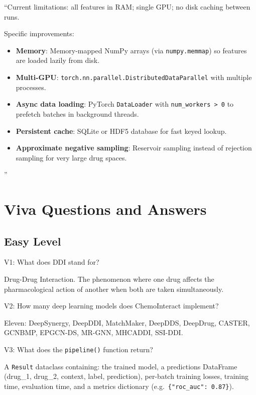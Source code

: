 \documentclass[12pt,a4paper,oneside]{book}
\begin{document}
\begin{tcolorbox}[questionbox,title={Q11: How would you scale ChemoInteract to 100 million drug pairs?}]
\end{tcolorbox}
\begin{tcolorbox}[answerbox]
``Current limitations: all features in RAM; single GPU; no disk caching between runs.

Specific improvements:
\begin{itemize}
  \item \textbf{Memory}: Memory-mapped NumPy arrays (via \texttt{numpy.memmap}) so features are loaded lazily from disk.
  \item \textbf{Multi-GPU}: \texttt{torch.nn.parallel.DistributedDataParallel} with multiple processes.
  \item \textbf{Async data loading}: PyTorch \texttt{DataLoader} with \texttt{num\_workers > 0} to prefetch batches in background threads.
  \item \textbf{Persistent cache}: SQLite or HDF5 database for fast keyed lookup.
  \item \textbf{Approximate negative sampling}: Reservoir sampling instead of rejection sampling for very large drug spaces.
\end{itemize}''
\end{tcolorbox}
\chapter{Viva Questions and Answers}\label{chap:viva}

\section{Easy Level}

\begin{tcolorbox}[vivabox]
V1: What does DDI stand for?
\end{tcolorbox}
Drug-Drug Interaction. The phenomenon where one drug affects the pharmacological action of another when both are taken simultaneously.

\begin{tcolorbox}[vivabox]
V2: How many deep learning models does ChemoInteract implement?
\end{tcolorbox}
Eleven: DeepSynergy, DeepDDI, MatchMaker, DeepDDS, DeepDrug, CASTER, GCNBMP, EPGCN-DS, MR-GNN, MHCADDI, SSI-DDI.

\begin{tcolorbox}[vivabox]
V3: What does the \texttt{pipeline()} function return?
\end{tcolorbox}
A \texttt{Result} dataclass containing: the trained model, a predictions DataFrame (drug\_1, drug\_2, context, label, prediction), per-batch training losses, training time, evaluation time, and a metrics dictionary (e.g.\ \texttt{\{"roc\_auc": 0.87\}}).
\end{document}
